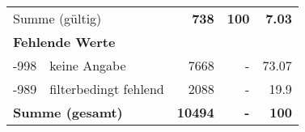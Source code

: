 \begin{longtable}{lXrrr}
     \midrule
     \multicolumn{2}{l}{Summe (gültig)} &
       \textbf{\num{738}} &
     \textbf{\num{100}} &
       \textbf{\num[round-mode=places,round-precision=2]{7.03}} \\
     \multicolumn{5}{l}{\textbf{Fehlende Werte}}\\
       -998 &
       keine Angabe &
         \num{7668} &
        - &
         \num[round-mode=places,round-precision=2]{73.07} \\
       -989 &
       filterbedingt fehlend &
         \num{2088} &
        - &
         \num[round-mode=places,round-precision=2]{19.9} \\
     \midrule
     \multicolumn{2}{l}{\textbf{Summe (gesamt)}} &
          \textbf{\num{10494}} &
        \textbf{-} &
        \textbf{\num{100}} \\
     \bottomrule
     \end{longtable}
     
